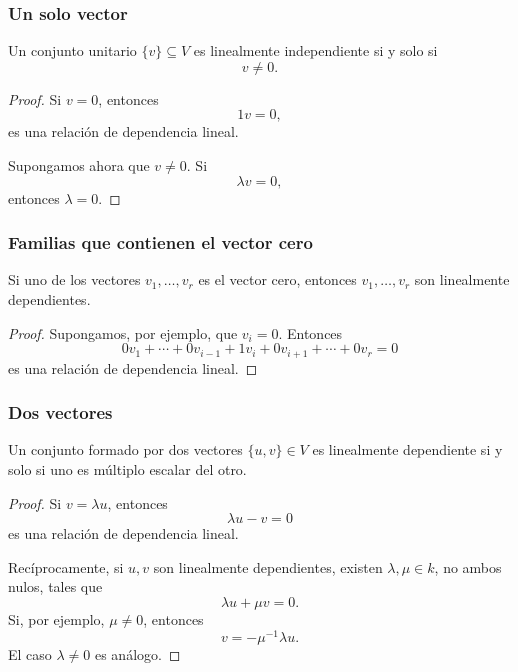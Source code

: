 \begin{frame}
    \frametitle{Un solo vector}

    \begin{proposition}
        Un conjunto unitario \(\{v\}\subseteq V\) es linealmente independiente si y solo si
        \[
            v\neq 0.
        \]
    \end{proposition}

    \begin{proof}
        Si \(v=0\), entonces
        \[
            1v=0,
        \]
        es una relación de dependencia lineal.

        Supongamos ahora que \(v\neq0\). Si
        \[
            \lambda v=0,
        \]
        entonces \(\lambda=0\).
    \end{proof}
\end{frame}


\begin{frame}
    \frametitle{Familias que contienen el vector cero}

    \begin{proposition}
        Si uno de los vectores \(v_1,\ldots,v_r\) es el vector cero,
        entonces \(v_1,\ldots,v_r\) son linealmente dependientes.
    \end{proposition}

    \begin{proof}
        Supongamos, por ejemplo, que \(v_i=0\). Entonces
        \[
            0v_1+\cdots+0v_{i-1}
            +1v_i
            +0v_{i+1}+\cdots+0v_r
            =0
        \]
        es una relación de dependencia lineal.
    \end{proof}
\end{frame}


\begin{frame}
    \frametitle{Dos vectores}

    \begin{proposition}
        Un conjunto formado por dos vectores \(\{u,v\}\in V\) es linealmente dependiente
        si y solo si uno es múltiplo escalar del otro.
    \end{proposition}

    \begin{proof}
        Si \(v=\lambda u\), entonces
        \[
            \lambda u-v=0
        \]
        es una relación de dependencia lineal.

        Recíprocamente, si \(u,v\) son linealmente dependientes, existen
        \(\lambda,\mu\in k\), no ambos nulos, tales que
        \[
            \lambda u+\mu v=0.
        \]
        Si, por ejemplo, \(\mu\neq0\), entonces
        \[
            v=-\mu^{-1}\lambda u.
        \]
        El caso \(\lambda\neq0\) es análogo.
    \end{proof}
\end{frame}


